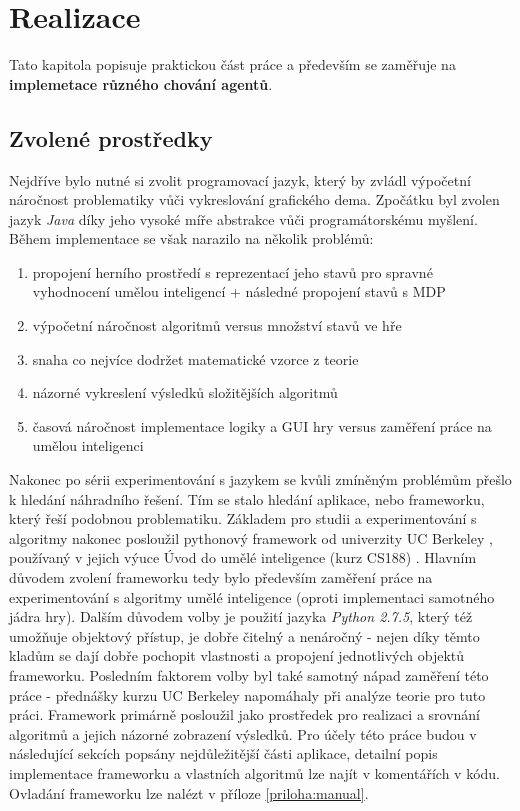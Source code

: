 \chapter{Realizace}
Tato kapitola popisuje praktickou část práce a především se zaměřuje na \textbf{implemetace různého chování agentů}.

\section{Zvolené prostředky}
Nejdříve bylo nutné si zvolit programovací jazyk, který by zvládl výpočetní náročnost problematiky vůči vykreslování grafického dema. Zpočátku byl zvolen jazyk \textit{Java} díky jeho vysoké míře abstrakce vůči programátorskému myšlení. Během implementace se však narazilo na několik problémů: 
\begin{enumerate}
\item propojení herního prostředí s reprezentací jeho stavů pro spravné vyhodnocení umělou inteligencí + následné propojení stavů s MDP
\item výpočetní náročnost algoritmů versus množství stavů ve hře
\item snaha co nejvíce dodržet matematické vzorce z teorie
\item názorné vykreslení výsledků složitějších algoritmů
\item časová náročnost implementace logiky a GUI hry versus zaměření práce na umělou inteligenci
\end{enumerate}
Nakonec po sérii experimentování s jazykem se kvůli zmíněným problémům přešlo k hledání náhradního řešení. Tím se stalo hledání aplikace, nebo frameworku, který řeší podobnou problematiku. Základem pro studii a experimentování s algoritmy nakonec posloužil pythonový framework od univerzity UC Berkeley \cite{pacmanProjects}, používaný v jejich výuce Úvod do umělé inteligence (kurz CS188) \cite{berkeley}. Hlavním důvodem zvolení frameworku tedy bylo především zaměření práce na experimentování s algoritmy umělé inteligence (oproti implementaci samotného jádra hry). Dalším důvodem volby je použití jazyka \textit{Python 2.7.5}, který též umožňuje objektový přístup, je dobře čitelný a nenáročný - nejen díky těmto kladům se dají dobře pochopit vlastnosti a propojení jednotlivých objektů frameworku. Posledním faktorem volby byl také samotný nápad zaměření této práce - přednášky kurzu UC Berkeley napomáhaly při analýze teorie pro tuto práci. Framework primárně posloužil jako prostředek pro realizaci a srovnání algoritmů a jejich názorné zobrazení výsledků.
Pro účely této práce budou v následující sekcích popsány nejdůležitější části aplikace, detailní popis implementace frameworku a vlastních algoritmů lze najít v komentářích v kódu. Ovladání frameworku lze nalézt v příloze \ref{priloha:manual}.

